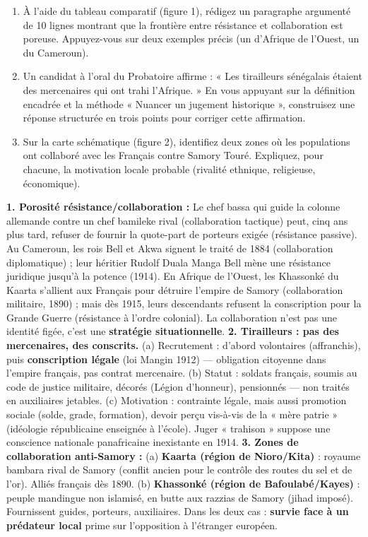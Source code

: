 \documentclass[11pt]{article}
\begin{document}
\begin{exercice}
\begin{enumerate}
    \item À l'aide du tableau comparatif (figure 1), rédigez un paragraphe argumenté de 10 lignes montrant que la frontière entre résistance et collaboration est poreuse. Appuyez-vous sur deux exemples précis (un d'Afrique de l'Ouest, un du Cameroun).
    \item Un candidat à l'oral du Probatoire affirme : « Les tirailleurs sénégalais étaient des mercenaires qui ont trahi l'Afrique. » En vous appuyant sur la définition encadrée et la méthode « Nuancer un jugement historique », construisez une réponse structurée en trois points pour corriger cette affirmation.
    \item Sur la carte schématique (figure 2), identifiez deux zones où les populations ont collaboré avec les Français contre Samory Touré. Expliquez, pour chacune, la motivation locale probable (rivalité ethnique, religieuse, économique).
\end{enumerate}
\end{exercice}

\begin{corrige}
\textbf{1. Porosité résistance/collaboration :} Le chef bassa qui guide la colonne allemande contre un chef bamileke rival (collaboration tactique) peut, cinq ans plus tard, refuser de fournir la quote-part de porteurs exigée (résistance passive). Au Cameroun, les rois Bell et Akwa signent le traité de 1884 (collaboration diplomatique) ; leur héritier Rudolf Duala Manga Bell mène une résistance juridique jusqu'à la potence (1914). En Afrique de l'Ouest, les Khassonké du Kaarta s'allient aux Français pour détruire l'empire de Samory (collaboration militaire, 1890) ; mais dès 1915, leurs descendants refusent la conscription pour la Grande Guerre (résistance à l'ordre colonial). La collaboration n'est pas une identité figée, c'est une \textbf{stratégie situationnelle}.
\textbf{2. Tirailleurs : pas des mercenaires, des conscrits.} (a) Recrutement : d'abord volontaires (affranchis), puis \textbf{conscription légale} (loi Mangin 1912) — obligation citoyenne dans l'empire français, pas contrat mercenaire. (b) Statut : soldats français, soumis au code de justice militaire, décorés (Légion d'honneur), pensionnés — non traités en auxiliaires jetables. (c) Motivation : contrainte légale, mais aussi promotion sociale (solde, grade, formation), devoir perçu vis-à-vis de la « mère patrie » (idéologie républicaine enseignée à l'école). Juger « trahison » suppose une conscience nationale panafricaine inexistante en 1914.
\textbf{3. Zones de collaboration anti-Samory :} (a) \textbf{Kaarta (région de Nioro/Kita)} : royaume bambara rival de Samory (conflit ancien pour le contrôle des routes du sel et de l'or). Alliés français dès 1890. (b) \textbf{Khassonké (région de Bafoulabé/Kayes)} : peuple mandingue non islamisé, en butte aux razzias de Samory (jihad imposé). Fournissent guides, porteurs, auxiliaires. Dans les deux cas : \textbf{survie face à un prédateur local} prime sur l'opposition à l'étranger européen.
\end{corrige}
\end{document}
